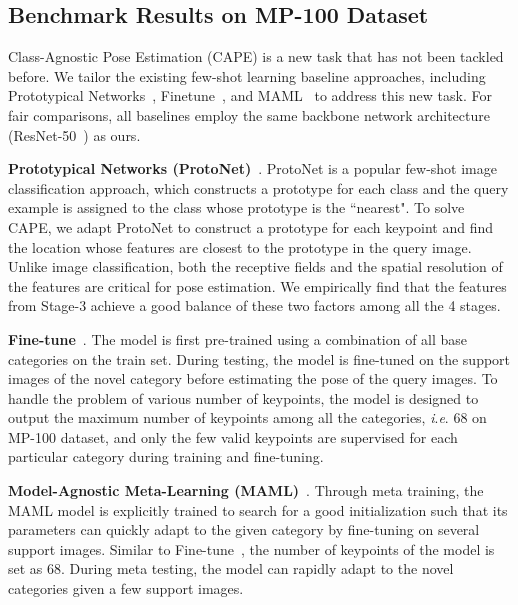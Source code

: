 \documentclass[runningheads]{llncs}
\newcommand{\ie}{\textit{i}.\textit{e}. }
\begin{document}
\subsection{Benchmark Results on MP-100 Dataset}

Class-Agnostic Pose Estimation (CAPE) is a new task that has not been tackled before. We tailor the existing few-shot learning baseline approaches, including Prototypical Networks~\cite{snell2017prototypical}, Finetune~\cite{nakamura2019revisiting}, and MAML~\cite{finn2017model} to address this new task. For fair comparisons, all baselines employ the same backbone network architecture (ResNet-50~\cite{he2016deep}) as ours.

\textbf{Prototypical Networks (ProtoNet)}~\cite{snell2017prototypical}. 
ProtoNet is a popular few-shot image classification approach, which constructs a prototype for each class and the query example is assigned to the class whose prototype is the ``nearest". To solve CAPE, we adapt ProtoNet to construct a prototype for each keypoint and find the location whose features are closest to the prototype in the query image. Unlike image classification, both the receptive fields and the spatial resolution of the features are critical for pose estimation. We empirically find that the features from Stage-3 achieve a good balance of these two factors among all the 4 stages.


\textbf{Fine-tune}~\cite{nakamura2019revisiting}. 
The model is first pre-trained using a combination of all base categories on the train set. During testing, the model is fine-tuned on the support images of the novel category before estimating the pose of the query images.
To handle the problem of various number of keypoints, the model is designed to output the maximum number of keypoints among all the categories, \ie 68 on MP-100 dataset, and only the few valid keypoints are supervised for each particular category during training and fine-tuning. 


\textbf{Model-Agnostic Meta-Learning (MAML)}~\cite{finn2017model}.
Through meta training, the MAML model is explicitly trained to search for a good initialization such that its parameters can quickly adapt to the given category by fine-tuning on several support images. Similar to Fine-tune~\cite{nakamura2019revisiting}, the number of keypoints of the model is set as 68. During meta testing, the model can rapidly adapt to the novel categories given a few support images.
\end{document}
